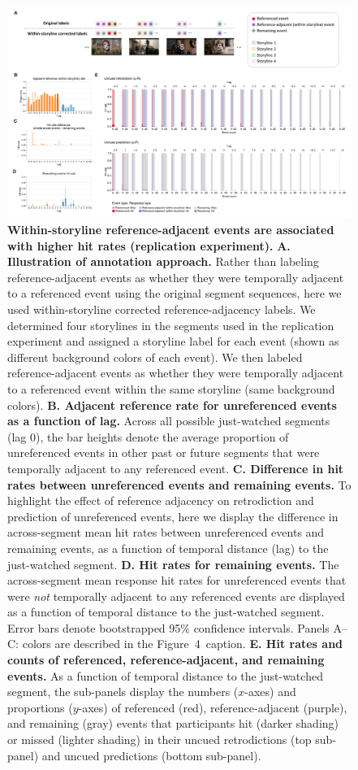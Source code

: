 \documentclass[10pt]{article}
\newcommand{\resultTwo}{4}
\begin{document}
\begin{figure}[tp]
    \centering
    \includegraphics[width=\textwidth]{results4_rep_sl}
    
      \caption{\textbf{Within-storyline reference-adjacent events are associated with higher hit rates (replication experiment).} \textbf{A. Illustration of annotation approach.} Rather than labeling reference-adjacent events as whether they were temporally adjacent to a referenced event using the original segment sequences, here we used within-storyline corrected reference-adjacency labels. We determined four storylines in the segments used in the replication experiment and assigned a storyline label for each event (shown as different background colors of each event). We then labeled reference-adjacent events as whether they were temporally adjacent to a referenced event within the same storyline (same background colors). \textbf{B. Adjacent reference rate for unreferenced events as a function of lag.} Across all possible just-watched segments (lag 0), the bar heights denote the average proportion of unreferenced events in other past or future segments that were temporally adjacent to any referenced event. \textbf{C. Difference in hit rates between unreferenced events and remaining events.} To highlight the effect of reference adjacency on retrodiction and prediction of unreferenced events, here we display the difference in across-segment mean hit rates between unreferenced events and remaining events, as a function of temporal distance (lag) to the just-watched segment. \textbf{D. Hit rates for remaining events.} The across-segment mean response hit rates for unreferenced events that were \textit{not} temporally adjacent to any referenced events are displayed as a function of temporal distance to the just-watched segment. Error bars denote bootstrapped 95\% confidence intervals. Panels A--C: colors are described in the Figure~\resultTwo~caption. \textbf{E. Hit rates and counts of referenced, reference-adjacent, and remaining events.} As a function of temporal distance to the just-watched segment, the sub-panels display the numbers ($x$-axes) and proportions ($y$-axes) of referenced (red), reference-adjacent (purple), and remaining (gray) events that participants hit (darker shading) or missed (lighter shading) in their uncued retrodictions (top sub-panel) and uncued predictions (bottom sub-panel).}
      
    \label{fig:results4_rep_sl}
\end{figure}
\end{document}
